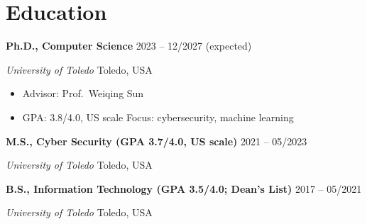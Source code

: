\documentclass[11pt,a4paper]{article}
\newcommand{\entry}[4]{%
  \textbf{#1} \hfill #2\par
  \textit{#3} \hfill #4\par\vspace{1pt}}
\begin{document}
\section{Education}
\entry{Ph.D., Computer Science}{2023 -- 12/2027 (expected)}
      {University of Toledo}{Toledo, USA}
\begin{itemize}
  \item Advisor: Prof.\ Weiqing Sun
  \item GPA: 3.8/4.0, US scale \quad Focus: cybersecurity, machine learning
\end{itemize}
\vspace{3pt}
\entry{M.S., Cyber Security \textmd{(GPA 3.7/4.0, US scale)}}{2021 -- 05/2023}
      {University of Toledo}{Toledo, USA}
\vspace{3pt}
\entry{B.S., Information Technology \textmd{(GPA 3.5/4.0; Dean's List)}}{2017 -- 05/2021}
      {University of Toledo}{Toledo, USA}

\end{document}
